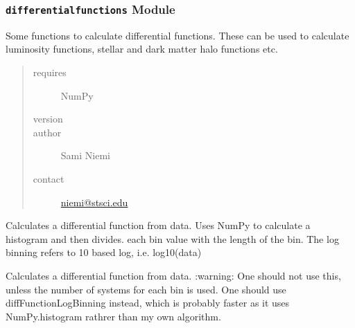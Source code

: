 \documentclass[letterpaper,10pt,english]{sphinxmanual}
\begin{document}
\subsubsection{\texttt{differentialfunctions} Module}
\label{SamPy.astronomy:module-SamPy.astronomy.differentialfunctions}\label{SamPy.astronomy:differentialfunctions-module}
Some functions to calculate differential functions. These
can be used to calculate luminosity functions, stellar and
dark matter halo functions etc.
\begin{quote}\begin{description}
\item[{requires}] \leavevmode
NumPy

\item[{version}] 

\item[{author}] \leavevmode
Sami Niemi

\item[{contact}] \leavevmode
\href{mailto:niemi@stsci.edu}{niemi@stsci.edu}

\end{description}\end{quote}


\begin{fulllineitems}
\label{SamPy.astronomy:SamPy.astronomy.differentialfunctions.diffFunctionLogBinning}
Calculates a differential function from data.
Uses NumPy to calculate a histogram and then divides.
each bin value with the length of the bin.
The log binning refers to 10 based log, i.e. log10(data)

\end{fulllineitems}



\begin{fulllineitems}
\label{SamPy.astronomy:SamPy.astronomy.differentialfunctions.diff_function_log_binning}
Calculates a differential function from data.
:warning: One should not use this, unless the number of
systems for each bin is used. One should use diffFunctionLogBinning
instead, which is probably faster as it uses NumPy.histogram
rathrer than my own algorithm.

\end{fulllineitems}
\end{document}
